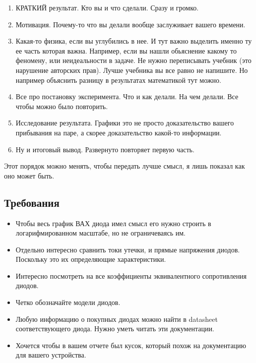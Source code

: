 \documentclass[a4paper,12pt]{article} %
\begin{document}
\begin{enumerate}
  \item КРАТКИЙ результат. Кто вы и что сделали. Сразу и громко.
  \item Мотивация. Почему-то что вы делали вообще заслуживает вашего времени.
  \item Какая-то физика, если вы углубились в нее. И тут важно выделить именно ту ее часть которая важна. Например, если вы нашли обьяснение какому то феномену, или неидеальности в задаче. Не нужно переписывать учебник (это нарушение авторских прав). Лучше учебника вы все равно не напишите. Но например объяснить разницу в результатах математикой тут можно.
  \item Все про постановку эксперимента. Что и как делали. На чем делали. Все чтобы можно было повторить.
  \item Исследование результата. Графики это не просто доказательство вашего прибывания на паре, а скорее доказательство какой-то информации.
  \item Ну и итоговый вывод. Развернуто повторяет первую часть.
\end{enumerate}
Этот порядок можно менять, чтобы передать лучше смысл, я лишь показал как оно может быть.


\subsection{Требования}
\begin{itemize}
  \item Чтобы весь график ВАХ диода имел смысл его нужно строить в логарифмированном масштабе, но не ограничеваясь им.
  \item Отдельно интересно сравнить токи утечки, и прямые напряжения диодов. Поскольку это их определяющие характеристики.
  \item Интересно посмотреть на все коэффициенты эквивалентного сопротивления диодов.
  \item Четко обозначайте модели диодов.
  \item Любую информацию о покупных диодах можно найти в datasheet соответствующего диода. Нужно уметь читать эти документации.
  \item Хочется чтобы в вашем отчете был кусок, который похож на документацию для вашего устройства.
\end{itemize}
\end{document}
